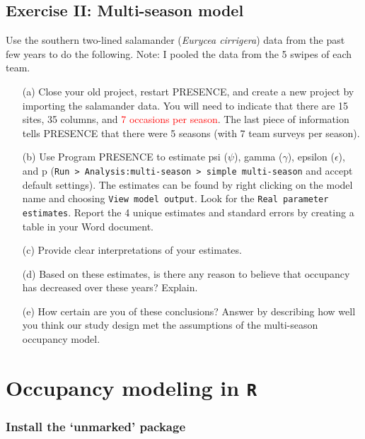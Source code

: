 \documentclass[12pt]{article}\usepackage[]{graphicx}\usepackage[]{color}
\begin{document}
\clearpage

\subsection*{Exercise II: Multi-season model}

Use the southern two-lined salamander ({\it Eurycea cirrigera})
data from the
past few years to do the following. Note: I pooled the data from
the 5 swipes of each team.   

\begin{enumerate}
  \item[(a)] Close your old project, restart PRESENCE, and create a
    new project by importing the salamander
    data. You will need to indicate that there are 15 sites, 35
    columns, and \textcolor{red}{7 occasions per season}. The last piece of
    information tells PRESENCE that there were 5 seasons (with 7 team
    surveys per season).  
  \item[(b)] Use Program PRESENCE to estimate psi ($\psi$), gamma
    ($\gamma$), epsilon ($\epsilon$),
    and p (\texttt{Run > Analysis:multi-season > simple multi-season}
    and accept default settings). The estimates can be found by right clicking on the
    model name and choosing \texttt{View model output}. Look for the 
    \texttt{Real parameter estimates}. Report the 4 unique
    estimates and standard errors by creating a table in your Word
    document.  
  \item[(c)] Provide clear interpretations of your estimates. 
  \item[(d)] Based on these estimates, is there any reason to believe
    that occupancy has decreased over these years? Explain. 
  \item[(e)] How certain are you of these conclusions? Answer by
    describing how well you think our study design met the assumptions
    of the multi-season occupancy model. 

\end{enumerate}




\clearpage


\section*{Occupancy modeling in \texttt{R}}

\subsubsection*{Install the `unmarked' package}
\end{document}
